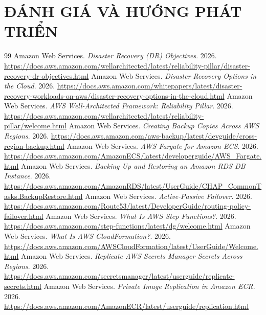 \documentclass[12pt, a4paper]{report}
\begin{document}
\chapter{ĐÁNH GIÁ VÀ HƯỚNG PHÁT TRIỂN}
\label{c:danhgia}

\clearpage

{}
\begin{thebibliography}{99}
 Amazon Web Services. \textit{Disaster Recovery (DR) Objectives}. 2026. \url{https://docs.aws.amazon.com/wellarchitected/latest/reliability-pillar/disaster-recovery-dr-objectives.html}
 Amazon Web Services. \textit{Disaster Recovery Options in the Cloud}. 2026. \url{https://docs.aws.amazon.com/whitepapers/latest/disaster-recovery-workloads-on-aws/disaster-recovery-options-in-the-cloud.html}
 Amazon Web Services. \textit{AWS Well-Architected Framework: Reliability Pillar}. 2026. \url{https://docs.aws.amazon.com/wellarchitected/latest/reliability-pillar/welcome.html}
 Amazon Web Services. \textit{Creating Backup Copies Across AWS Regions}. 2026. \url{https://docs.aws.amazon.com/aws-backup/latest/devguide/cross-region-backup.html}
 Amazon Web Services. \textit{AWS Fargate for Amazon ECS}. 2026. \url{https://docs.aws.amazon.com/AmazonECS/latest/developerguide/AWS_Fargate.html}
 Amazon Web Services. \textit{Backing Up and Restoring an Amazon RDS DB Instance}. 2026. \url{https://docs.aws.amazon.com/AmazonRDS/latest/UserGuide/CHAP_CommonTasks.BackupRestore.html}
 Amazon Web Services. \textit{Active-Passive Failover}. 2026. \url{https://docs.aws.amazon.com/Route53/latest/DeveloperGuide/routing-policy-failover.html}
 Amazon Web Services. \textit{What Is AWS Step Functions?}. 2026. \url{https://docs.aws.amazon.com/step-functions/latest/dg/welcome.html}
 Amazon Web Services. \textit{What Is AWS CloudFormation?}. 2026. \url{https://docs.aws.amazon.com/AWSCloudFormation/latest/UserGuide/Welcome.html}
 Amazon Web Services. \textit{Replicate AWS Secrets Manager Secrets Across Regions}. 2026. \url{https://docs.aws.amazon.com/secretsmanager/latest/userguide/replicate-secrets.html}
 Amazon Web Services. \textit{Private Image Replication in Amazon ECR}. 2026. \url{https://docs.aws.amazon.com/AmazonECR/latest/userguide/replication.html}
\end{thebibliography}
\clearpage
\end{document}

